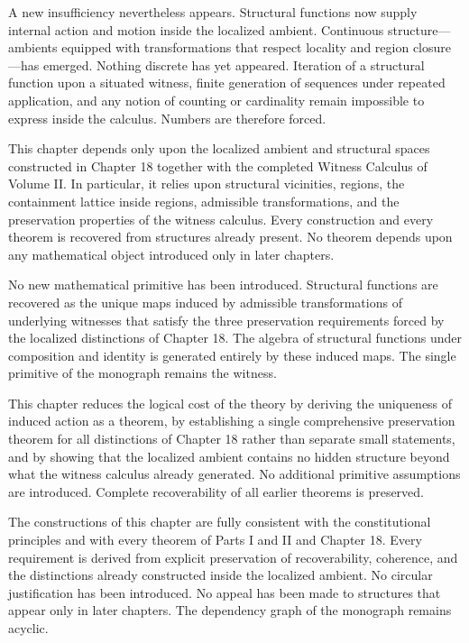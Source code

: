 \documentclass[12pt,anyside]{book}
\begin{document}
A new insufficiency nevertheless appears. Structural functions now supply internal action and motion inside the localized ambient. Continuous structure---ambients equipped with transformations that respect locality and region closure---has emerged. Nothing discrete has yet appeared. Iteration of a structural function upon a situated witness, finite generation of sequences under repeated application, and any notion of counting or cardinality remain impossible to express inside the calculus. Numbers are therefore forced.

\begin{dependencyaudit}
This chapter depends only upon the localized ambient and structural spaces constructed in Chapter 18 together with the completed Witness Calculus of Volume II. In particular, it relies upon structural vicinities, regions, the containment lattice inside regions, admissible transformations, and the preservation properties of the witness calculus. Every construction and every theorem is recovered from structures already present. No theorem depends upon any mathematical object introduced only in later chapters.
\end{dependencyaudit}

\begin{primitiveaudit}
No new mathematical primitive has been introduced. Structural functions are recovered as the unique maps induced by admissible transformations of underlying witnesses that satisfy the three preservation requirements forced by the localized distinctions of Chapter 18. The algebra of structural functions under composition and identity is generated entirely by these induced maps. The single primitive of the monograph remains the witness.
\end{primitiveaudit}

\begin{reductionaudit}
This chapter reduces the logical cost of the theory by deriving the uniqueness of induced action as a theorem, by establishing a single comprehensive preservation theorem for all distinctions of Chapter 18 rather than separate small statements, and by showing that the localized ambient contains no hidden structure beyond what the witness calculus already generated. No additional primitive assumptions are introduced. Complete recoverability of all earlier theorems is preserved.
\end{reductionaudit}

\begin{consistencyaudit}
The constructions of this chapter are fully consistent with the constitutional principles and with every theorem of Parts I and II and Chapter 18. Every requirement is derived from explicit preservation of recoverability, coherence, and the distinctions already constructed inside the localized ambient. No circular justification has been introduced. No appeal has been made to structures that appear only in later chapters. The dependency graph of the monograph remains acyclic.
\end{consistencyaudit}
\end{document}
